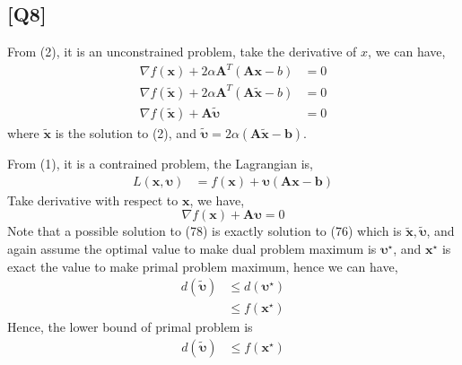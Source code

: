 \documentclass[12pt, a4 paper]{article}
\begin{document}
    \begin{framed}
        \section{[Q8]}
        From (2), it is an unconstrained problem, take the derivative of $x$,
        we can have,
        \begin{align}
            \nabla f(\boldsymbol{x}) + 2\alpha \boldsymbol{A}^{T}
            (\boldsymbol{A}\boldsymbol{x}-b) &= 0\\
            \nabla f(\tilde{\boldsymbol{x}}) + 2\alpha \boldsymbol{A}^{T}
            (\boldsymbol{A}\tilde{\boldsymbol{x}}-b) &= 0\\
            \nabla f(\tilde{\boldsymbol{x}}) + \boldsymbol{A}\tilde{\boldsymbol{\upsilon}} &= 0
        \end{align}
        \indent where $\tilde{\boldsymbol{x}}$ is the solution to (2), and $\tilde{\boldsymbol{\upsilon}}=
        2\alpha(\boldsymbol{A} \tilde{\boldsymbol{x}} - \boldsymbol{b})$.

        From (1), it is a contrained problem, the Lagrangian is,
        \begin{align}
            L(\boldsymbol{x}, \boldsymbol{\upsilon}) &= f(\boldsymbol{x}) + 
            \boldsymbol{\upsilon} (\boldsymbol{A} \boldsymbol{x} - \boldsymbol{b})
        \end{align}
        \indent Take derivative with respect to $\boldsymbol{x}$, we have,
        \begin{equation}
            \nabla f(\boldsymbol{x}) + \boldsymbol{A} \boldsymbol{\upsilon} = 0
        \end{equation}
        \indent Note that a possible solution to (78) is exactly solution to
        (76) which is $\tilde{\boldsymbol{x}}, \tilde{\boldsymbol{\upsilon}}$,
        and again assume the optimal value to make
        dual problem maximum is ${\boldsymbol{\upsilon}}^{\star}$,  and 
        $\boldsymbol{x}^{\star}$ is exact the value to make
        primal problem maximum, hence we can have,
        \begin{align}
            d(\tilde{\boldsymbol{\upsilon}}) &\leq 
            d(\boldsymbol{\upsilon}^{\star}) \\
            &\leq f(\boldsymbol{x}^{\star})
        \end{align}
        \indent Hence, the lower bound of primal problem is
        \begin{align}
            d(\boldsymbol{\tilde{\upsilon}}) &\leq f(\boldsymbol{x}^{\star})
        \end{align}
    \end{framed}
\end{document}
